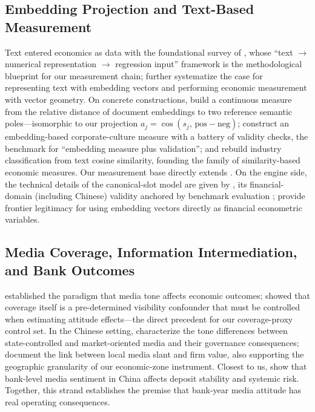 \subsection{Embedding Projection and Text-Based Measurement}\label{sec:lit:embed}
Text entered economics as data with the foundational survey of
\textcite{gentzkow2019text}, whose ``text $\to$ numerical
representation $\to$ regression input'' framework is the methodological
blueprint for our measurement chain; \textcite{ash2023text} further
systematize the case for representing text with embedding vectors and
performing economic measurement with vector geometry. On concrete
constructions, \textcite{gennaro2022emotion} build a continuous measure
from the relative distance of document embeddings to two reference
semantic poles---isomorphic to our projection
$a_j=\cos(s_j,\,\mathrm{pos}-\mathrm{neg})$;
\textcite{li2021culture} construct an embedding-based corporate-culture
measure with a battery of validity checks, the benchmark for
``embedding measure plus validation''; and \textcite{hoberg2016text}
rebuild industry classification from text cosine similarity, founding
the family of similarity-based economic measures. Our measurement base
directly extends \textcite{jha2026benefit}. On the engine side, the
technical details of the canonical-slot model are given by
\textcite{zhang2025qwen3}, its financial-domain (including Chinese)
validity anchored by benchmark evaluation \parencite{tang2025finmteb};
\textcite{gabaix2025asset} provide frontier legitimacy for using
embedding vectors directly as financial econometric variables.

\subsection{Media Coverage, Information Intermediation, and Bank Outcomes}\label{sec:lit:media}
\textcite{tetlock2007content} established the paradigm that media tone
affects economic outcomes; \textcite{fang2009media} showed that
coverage itself is a pre-determined visibility confounder that must be
controlled when estimating attitude effects---the direct precedent for
our coverage-proxy control set. In the Chinese setting,
\textcite{you2018pen} characterize the tone differences between
state-controlled and market-oriented media and their governance
consequences; \textcite{gurun2012hype} document the link between local
media slant and firm value, also supporting the geographic granularity
of our economic-zone instrument. Closest to us,
\textcite{fang2024mediasentiment} show that bank-level media sentiment
in China affects deposit stability and systemic risk. Together, this
strand establishes the premise that bank-year media attitude has real
operating consequences.

